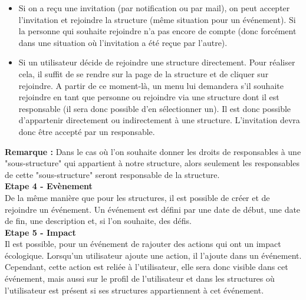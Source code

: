\begin{itemize}
    \item Si on a reçu une invitation (par notification ou par mail), on peut accepter l'invitation et rejoindre la structure (même situation pour un événement). Si la personne qui souhaite rejoindre n'a pas encore de compte (donc forcément dans une situation où l'invitation a été reçue par l'autre). 
    \item Si un utilisateur décide de rejoindre une structure directement. Pour réaliser cela, il suffit de se rendre sur la page de la structure et de cliquer sur rejoindre. A partir de ce moment-là, un menu lui demandera s'il souhaite rejoindre en tant que personne ou rejoindre via une structure dont il est responsable (il sera donc possible d'en sélectionner un). Il est donc possible d'appartenir directement ou indirectement à une structure. L'invitation devra donc être accepté par un responsable.
\end{itemize}
\textbf{Remarque :} Dans le cas où l'on souhaite donner les droits de responsables à une "sous-structure" qui appartient à notre structure, alors seulement les responsables de cette "sous-structure" seront responsable de la structure.\\
\newline 
\textbf{Etape 4 - Evènement}\\
De la même manière que pour les structures, il est possible de créer et de rejoindre un événement. Un événement est défini par une date de début, une date de fin, une description et, si l'on souhaite, des défis. \\
\newline 
\textbf{Etape 5 - Impact}\\
Il est possible, pour un événement de rajouter des actions qui ont un impact écologique. Lorsqu'un utilisateur ajoute une action, il l'ajoute dans un événement. Cependant, cette action est reliée à l'utilisateur, elle sera donc visible dans cet événement, mais aussi sur le profil de l'utilisateur et dans les structures où l'utilisateur est présent si ses structures appartiennent à cet événement. 



